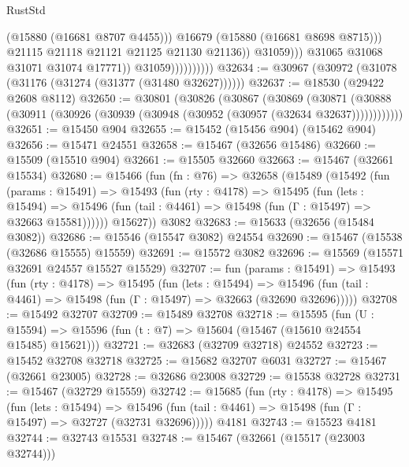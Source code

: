 \begin{lexlean}{RustStd}
\begin{coremodule}
                                          (@15880 (@16681 @8707 @4455)))
                                        @16679
                                        (@15880 (@16681 @8698 @8715)))
                                      @21115
                                      @21118
                                      @21121
                                      @21125
                                      @21130
                                      @21136))
                                  @31059)))
                            @31065
                            @31068
                            @31071
                            @31074
                            @17771))
                        @31059))))))))))
@32634 := @30967 (@30972 (@31078 (@31176 (@31274 (@31377 (@31480 @32627))))))
@32637 := @18530 (@29422 @2608 @8112)
@32650 := @30801
    (@30826
      (@30867
        (@30869
          (@30871 (@30888 (@30911 (@30926 (@30939 (@30948 (@30952 (@30957 (@32634 @32637))))))))))))
@32651 := @15450 @904
@32655 := @15452 (@15456 @904) (@15462 @904)
@32656 := @15471 @24551
@32658 := @15467 (@32656 @15486)
@32660 := @15509 (@15510 @904)
@32661 := @15505 @32660
@32663 := @15467 (@32661 @15534)
@32680 := @15466
    (fun (fn : @76) =>
    @32658
      (@15489
        (@15492
          (fun (params : @15491) =>
          @15493
            (fun (rty : @4178) =>
            @15495
              (fun (lets : @15494) =>
              @15496 (fun (tail : @4461) => @15498 (fun (Γ : @15497) => @32663 @15581))))))
        @15627))
    @3082
@32683 := @15633 (@32656 (@15484 @3082))
@32686 := @15546 (@15547 @3082) @24554
@32690 := @15467 (@15538 (@32686 @15555) @15559)
@32691 := @15572 @3082
@32696 := @15569 (@15571 @32691 @24557 @15527 @15529)
@32707 := fun (params : @15491) =>
  @15493
    (fun (rty : @4178) =>
    @15495
      (fun (lets : @15494) =>
      @15496 (fun (tail : @4461) => @15498 (fun (Γ : @15497) => @32663 (@32690 @32696)))))
@32708 := @15492 @32707
@32709 := @15489 @32708
@32718 := @15595
    (fun (U : @15594) => @15596 (fun (t : @7) => @15604 (@15467 (@15610 @24554 @15485) @15621)))
@32721 := @32683 (@32709 @32718) @24552
@32723 := @15452 @32708 @32718
@32725 := @15682 @32707 @6031
@32727 := @15467 (@32661 @23005)
@32728 := @32686 @23008
@32729 := @15538 @32728
@32731 := @15467 (@32729 @15559)
@32742 := @15685
    (fun (rty : @4178) =>
    @15495
      (fun (lets : @15494) =>
      @15496 (fun (tail : @4461) => @15498 (fun (Γ : @15497) => @32727 (@32731 @32696)))))
    @4181
@32743 := @15523 @4181
@32744 := @32743 @15531
@32748 := @15467 (@32661 (@15517 (@23003 @32744)))

\end{coremodule}
\end{lexlean}
